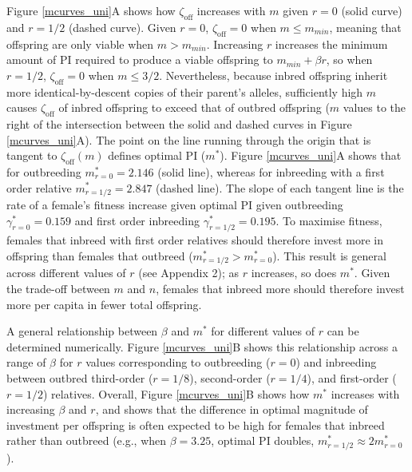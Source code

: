 \documentclass[12pt]{article}
\begin{document}
Figure \ref{mcurves_uni}A shows how $\zeta_{\textrm{off}}$ increases with $m$ given $r=0$ (solid curve) and $r=1/2$ (dashed curve). Given $r=0$, $\zeta_{\textrm{off}}=0$ when $m \leq m_{min}$, meaning that offspring are only viable when $m>m_{min}$. Increasing $r$ increases the minimum amount of PI required to produce a viable offspring to $m_{min}+\beta r$, so when $r=1/2$, $\zeta_{\textrm{off}}=0$ when $m \leq 3/2$. Nevertheless, because inbred offspring inherit more identical-by-descent copies of their parent's alleles, sufficiently high $m$ causes $\zeta_{\textrm{off}}$ of inbred offspring to exceed that of outbred offspring ($m$ values to the right of the intersection between the solid and dashed curves in Figure \ref{mcurves_uni}A). The point on the line running through the origin that is tangent to $\zeta_{\textrm{off}}(m)$ defines optimal PI ($m^{*}$). Figure \ref{mcurves_uni}A shows that for outbreeding $m^{*}_{r=0}=2.146$ (solid line), whereas for inbreeding with a first order relative $m^{*}_{r=1/2}=2.847$ (dashed line). The slope of each tangent line is the rate of a female's fitness increase given optimal PI given outbreeding $\gamma^{*}_{r=0}=0.159$ and first order inbreeding $\gamma^{*}_{r=1/2}=0.195$. To maximise fitness, females that inbreed with first order relatives should therefore invest more in offspring than females that outbreed ($m^{*}_{r=1/2}>m^{*}_{r=0}$). This result is general across different values of $r$ (see Appendix 2); as $r$ increases, so does $m^{*}$. Given the trade-off between $m$ and $n$, females that inbreed more should therefore invest more per capita in fewer total offspring. 

A general relationship between $\beta$ and $m^{*}$ for different values of $r$ can be determined numerically. Figure \ref{mcurves_uni}B shows this relationship across a range of $\beta$ for $r$ values corresponding to outbreeding ($r=0$) and inbreeding between outbred third-order ($r=1/8$), second-order ($r=1/4$), and first-order ($r=1/2$) relatives. Overall, Figure \ref{mcurves_uni}B shows how $m^{*}$ increases with increasing $\beta$ and $r$, and shows that the difference in optimal magnitude of investment per offspring is often expected to be high for females that inbreed rather than outbreed (e.g., when $\beta=3.25$, optimal PI doubles, $m^{*}_{r=1/2} \approx 2m^{*}_{r=0}$).
\end{document}

